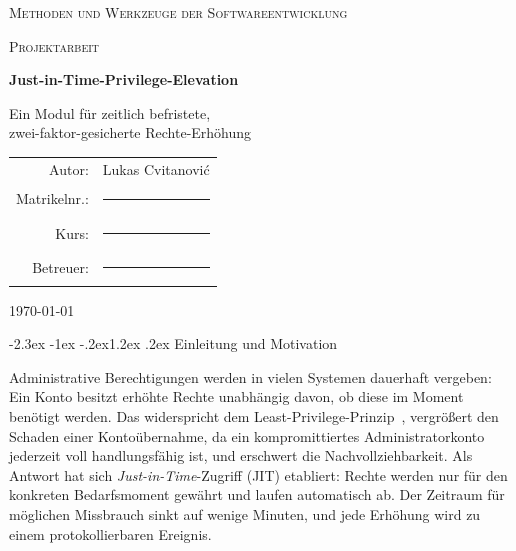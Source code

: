 \documentclass[11pt,a4paper]{article}
\makeatletter
\renewcommand\section{\@startsection{section}{1}{\z@}%
  {-2.3ex \@plus -1ex \@minus -.2ex}{1.2ex \@plus .2ex}%
  {\normalfont\Large\bfseries}}
\makeatother
\begin{document}
\begin{titlepage}
  \centering
  {\scshape\large Methoden und Werkzeuge der Softwareentwicklung\par}
  \vspace{0.5cm}
  {\scshape Projektarbeit\par}
  \vfill
  {\Huge\bfseries Just-in-Time-Privilege-Elevation\par}
  \vspace{0.8cm}
  {\Large Ein Modul für zeitlich befristete,\\[0.2em]
   zwei-faktor-gesicherte Rechte-Erhöhung\par}
  \vfill
  \begin{tabular}{rl}
    Autor:        & Lukas Cvitanović \\        %
    Matrikelnr.:  & \rule{4cm}{0.4pt} \\        %
    Kurs:         & \rule{4cm}{0.4pt} \\        %
    Betreuer:     & \rule{4cm}{0.4pt} \\        %
  \end{tabular}
  \vspace{1.5cm}

  {\large \today\par}
\end{titlepage}

\tableofcontents
\clearpage

\section{Einleitung und Motivation}

Administrative Berechtigungen werden in vielen Systemen dauerhaft vergeben:
Ein Konto besitzt erhöhte Rechte unabhängig davon, ob diese im Moment benötigt
werden. Das widerspricht dem Least-Privilege-Prinzip~\cite{owasp_polp}, vergrößert
den Schaden einer Kontoübernahme, da ein kompromittiertes Administratorkonto jederzeit
voll handlungsfähig ist, und erschwert die Nachvollziehbarkeit. Als Antwort hat
sich \emph{Just-in-Time}-Zugriff (JIT) etabliert: Rechte werden nur für den
konkreten Bedarfsmoment gewährt und laufen automatisch ab. Der Zeitraum für
möglichen Missbrauch sinkt auf wenige Minuten, und jede Erhöhung wird zu einem
protokollierbaren Ereignis.
\end{document}

